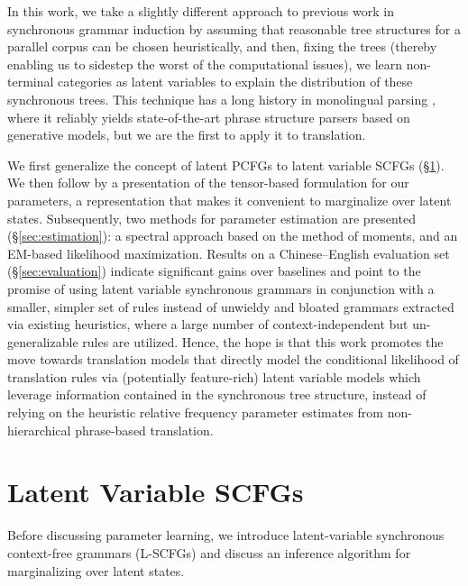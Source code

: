 \documentclass[11pt]{article}
\newcommand{\ignore}[1]{}
\begin{document}
In this work, we take a slightly different approach to previous work in synchronous grammar induction by assuming that reasonable tree structures for a parallel corpus can be chosen heuristically, and then, fixing the trees (thereby enabling us to sidestep the worst of the computational issues), we learn non-terminal categories as latent variables to explain the distribution of these synchronous trees. 
This technique has a long history in monolingual parsing \cite{Petrov2006,Liang2007,Cohen2012a}, where it reliably yields state-of-the-art phrase structure parsers based on generative models, but we are the first to apply it to translation.

\ignore{Our approach refines single-category (``Hiero'') synchronous grammars by incorporating additional context via a latent variable model, featurized over inside and outside sub-trees of synchronous derivation trees for source-target sentence pairs.  }
We first generalize the concept of latent PCFGs to latent variable SCFGs (\S\ref{sec:formalism}). We then follow by a presentation of the tensor-based formulation for our parameters, a representation that makes it convenient to marginalize over latent states.  
Subsequently, two methods for parameter estimation are presented (\S\ref{sec:estimation}): a spectral approach based on the method of moments, and an EM-based likelihood maximization.  
Results on a Chinese--English evaluation set (\S\ref{sec:evaluation}) indicate significant gains over baselines and point to the promise of using latent variable synchronous grammars in conjunction with a smaller, simpler set of rules instead of unwieldy and bloated grammars extracted via existing heuristics, where a large number of context-independent but un-generalizable rules are utilized.  
Hence, the hope is that this work promotes the move towards translation models that directly model the conditional likelihood of translation rules via (potentially feature-rich) latent variable models which leverage information contained in the synchronous tree structure, instead of relying on the heuristic relative frequency parameter estimates \cite{Koehn2003} from non-hierarchical phrase-based translation.  

\section{Latent Variable SCFGs}
\label{sec:formalism}

Before discussing parameter learning, we introduce latent-variable synchronous context-free grammars (L-SCFGs) and discuss an inference algorithm for marginalizing over latent states.  
\end{document}
